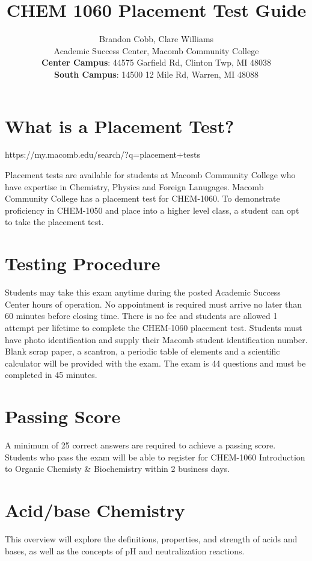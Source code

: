 \documentclass[10pt, roman]{article}
\title{CHEM 1060 Placement Test Guide}
\author{
Brandon Cobb, Clare Williams \\
Academic Success Center, Macomb Community College \\
\textbf{Center Campus}: 44575 Garfield Rd, Clinton Twp, MI 48038 \\
\textbf{South Campus}: 14500 12 Mile Rd, Warren, MI 48088
}
\begin{document}
\maketitle

\tableofcontents

\section{What is a Placement Test?}
{\centering https://my.macomb.edu/search/?q=placement+tests\par}
Placement tests are available for students at Macomb Community College who have expertise in Chemistry, Physics and Foreign Lanugages.
Macomb Community College has a placement test for CHEM-1060.
To demonstrate proficiency in CHEM-1050 and place into a higher level class, a student can opt to take the placement test.

\section{Testing Procedure}
Students may take this exam anytime during the posted Academic Success Center hours of operation.
No appointment is required must arrive no later than 60 minutes before closing time.
There is no fee and students are allowed 1 attempt per lifetime to complete the CHEM-1060 placement test.
Students must have photo identification and supply their Macomb student identification number.
Blank scrap paper, a scantron, a periodic table of elements and a scientific calculator will be provided with the exam.
The exam is 44 questions and must be completed in 45 minutes.

\section{Passing Score}

A minimum of 25 correct answers are required to achieve a passing score.
Students who pass the exam will be able to register for CHEM-1060 Introduction to Organic Chemisty \& Biochemistry within 2 business days.

\section{Acid/base Chemistry}
This overview will explore the definitions, properties, and strength of acids and bases, as well as the concepts of pH and neutralization reactions.
\end{document}
